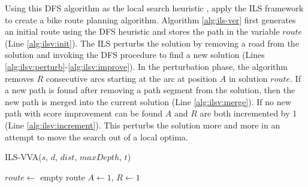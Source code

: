 \documentclass[honors]{union-cs-thesis}
\begin{document}
Using this DFS algorithm as the local search heuristic \citeauthor{verbeeck2014extension}, apply the ILS framework to create a bike route planning algorithm. Algorithm \ref{alg:ils-ver} first generates an initial route using the DFS heuristic and stores the path in the variable $route$ (Line \ref{alg:ilsv:init}). The ILS perturbs the solution by removing a road from the solution and invoking the DFS procedure to find a new solution (Lines \ref{alg:ilsv:perturb}-\ref{alg:ilsv:improve}). In the perturbation phase, the algorithm removes $R$ consecutive arcs starting at the arc at position $A$ in solution $route$. If a new path is found after removing a path segment from the solution, then the new path is merged into the current solution (Line \ref{alg:ilsv:merge}). If no new path with score improvement can be found $A$ and $R$ are both incremented by 1 (Line \ref{alg:ilsv:increment}). This perturbs the solution more and more in an attempt to move the search out of a local optima.

%
%
\begin{algorithm}
    \caption{ILS-VVA($s$, $d$, $dist$, $maxDepth$, $t$) \label{alg:ils-ver}}
    
    $route \gets$ empty route\;
    $A \gets 1$, $R \gets 1$\;
    
    
\end{algorithm}
\end{document}

